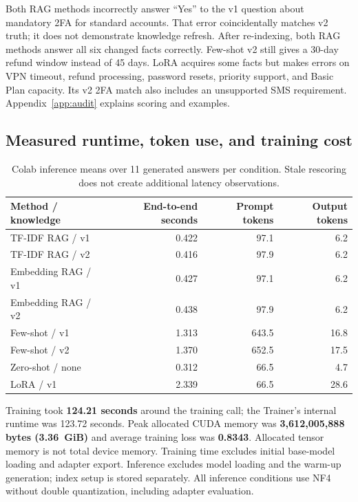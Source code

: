 \documentclass[10pt,letterpaper]{article}
\begin{document}
Both RAG methods incorrectly answer ``Yes'' to the v1 question about mandatory 2FA for standard accounts. That error coincidentally matches v2 truth; it does not demonstrate knowledge refresh. After re-indexing, both RAG methods answer all six changed facts correctly. Few-shot v2 still gives a 30-day refund window instead of 45 days. LoRA acquires some facts but makes errors on VPN timeout, refund processing, password resets, priority support, and Basic Plan capacity. Its v2 2FA match also includes an unsupported SMS requirement. Appendix~\ref{app:audit} explains scoring and examples.

\subsection{Measured runtime, token use, and training cost}
\begin{table}[htbp]\centering\small
\caption{Colab inference means over 11 generated answers per condition. Stale rescoring does not create additional latency observations.}\label{tab:latency}
\begin{tabular}{lrrr}\toprule
Method / knowledge & End-to-end seconds & Prompt tokens & Output tokens\\\midrule
TF-IDF RAG / v1 & 0.422 & 97.1 & 6.2\\
TF-IDF RAG / v2 & 0.416 & 97.9 & 6.2\\
Embedding RAG / v1 & 0.427 & 97.1 & 6.2\\
Embedding RAG / v2 & 0.438 & 97.9 & 6.2\\
Few-shot / v1 & 1.313 & 643.5 & 16.8\\
Few-shot / v2 & 1.370 & 652.5 & 17.5\\
Zero-shot / none & 0.312 & 66.5 & 4.7\\
LoRA / v1 & 2.339 & 66.5 & 28.6\\\bottomrule
\end{tabular}
\end{table}

Training took \textbf{124.21 seconds} around the training call; the Trainer's internal runtime was 123.72 seconds. Peak allocated CUDA memory was \textbf{3,612,005,888 bytes (3.36~GiB)} and average training loss was \textbf{0.8343}. Allocated tensor memory is not total device memory. Training time excludes initial base-model loading and adapter export. Inference excludes model loading and the warm-up generation; index setup is stored separately. All inference conditions use NF4 without double quantization, including adapter evaluation.
\end{document}
